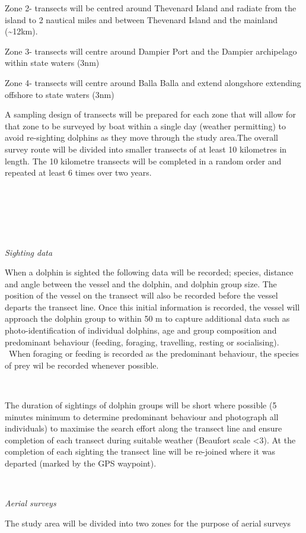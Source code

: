 \documentclass[version=last,
    paper=a4,                               %
    10pt,                                   %
    dvipsnames,
    oneside,                              %
    headings=openany,                       %
    open=any,
    BCOR=7mm,                               %
    DIV=15,     %
]{scrbook}
\begin{document}
Zone 2- transects will be centred around Thevenard Island and radiate
from the island to 2 nautical miles and between Thevenard Island and the
mainland (\textasciitilde12km).

Zone 3- transects will centre around Dampier Port and the Dampier
archipelago within state waters (3nm)

Zone 4- transects will centre around Balla Balla and extend alongshore
extending offshore to state waters (3nm)

A sampling design of transects will be prepared for each zone that will
allow for that zone to be surveyed by boat within a single day (weather
permitting) to avoid re-sighting dolphins as they move through the study
area.The overall survey route will be divided into smaller transects of
at least 10 kilometres in length. The 10 kilometre transects will be
completed in a random order and repeated at least 6 times over two
years.

\emph{~}

\emph{~}

\emph{~}

\emph{Sighting data}

When a dolphin is sighted the following data will be recorded; species,
distance and angle between the vessel and the dolphin, and dolphin group
size. The position of the vessel on the transect will also be recorded
before the vessel departs the transect line. Once this initial
information is recorded, the vessel will approach the dolphin group to
within 50 m to capture additional data such as photo-identification of
individual dolphins, age and group composition and predominant behaviour
(feeding, foraging, travelling, resting or socialising). ~When foraging
or feeding is recorded as the predominant behaviour, the species of prey
wil be recorded whenever possible.~

~

The duration of sightings of dolphin groups will be short where possible
(5 minutes minimum to determine predominant behaviour and photograph all
individuals) to maximise the search effort along the transect line and
ensure completion of each transect during suitable weather (Beaufort
scale \textless3). At the completion of each sighting the transect line
will be re-joined where it was departed (marked by the GPS waypoint).

~

\emph{Aerial surveys}

The study area will be divided into two zones for the purpose of aerial
surveys
\end{document}
